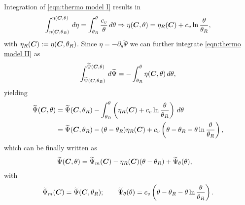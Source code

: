 Integration of \eqref{eqn:thermo model I} results in
%
\begin{equation}\label{eqn:thermo model II}
\begin{aligned}
\int_{\eta(\vect{C},\theta_R)}^{\eta(\vect{C},\theta)}\,d\eta = 
\int_{\theta_R}^{\theta}\frac{c_v}{\theta}\,d\theta\Rightarrow 
%
\eta(\vect{C},\theta) = \eta_R(\vect{C}) + c_v\ln \frac{\theta}{\theta_R},
\end{aligned}
\end{equation}
%
with $\eta_R(\boldsymbol{C}):=\eta(\boldsymbol{C},\theta_R)$.
Since $\eta=-\partial_{\theta}\widetilde{\Psi}$ we can further integrate \eqref{eqn:thermo model II} as
%
\begin{equation}
\int_{\widetilde{\Psi}(\boldsymbol{C},\theta_R)}^{\widetilde{\Psi}(\boldsymbol{C},\theta)}\,d\widetilde{\Psi}  = -\int_{\theta_R}^{\theta}\eta(\boldsymbol{C},\theta)\,d\theta, 
\end{equation}
%
yielding
%
\begin{equation}
\begin{aligned}
\widetilde{\Psi}(\vect{C},\theta)&= \widetilde{\Psi}(\vect{C},\theta_R)-\int_{\theta_R}^{\theta}\left(\eta_R(\vect{C})+c_v\ln\frac{\theta}{\theta_R}\right)\,d\theta\\
%
&=\widetilde{\Psi}(\vect{C},\theta_R)-(\theta-\theta_R)\eta_R(\vect{C}) +  c_v\left(\theta-\theta_R - \theta\ln\frac{\theta}{\theta_R}\right),
%
\end{aligned}
\end{equation}
%
which can be finally written as
%
\begin{equation}
\begin{aligned}
\widetilde{\Psi}(\vect{C},\theta)&= \widetilde{\Psi}_m(\vect{C}) -{\eta}_R(\vect{C})(\theta-\theta_R)+\widetilde{\Psi}_{\theta}(\theta),
%
\end{aligned}
\end{equation}
%
with
%
\begin{equation}
\begin{aligned}
\widetilde{\Psi}_m(\vect{C}) = \widetilde{\Psi}(\vect{C},\theta_R);\qquad
%
%
\widetilde{\Psi}_{\theta}(\theta)= c_v\left(\theta-\theta_R - \theta\ln\frac{\theta}{\theta_R}\right).
\end{aligned}
%
\end{equation}






